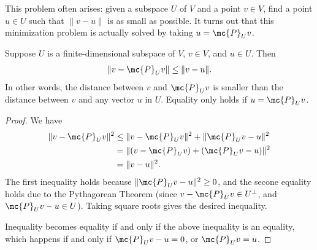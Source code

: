 \documentclass[math0540-lecture-notes.tex]{subfiles}
\begin{document}
This problem often arises: given a subspace $U$ of $V$ and a point $v\in V$, find a point $u\in U$
such that $\|v-u\|$ is as small as possible. It turns out that this minimization problem is actually
solved by taking $u=\mc{P}_Uv$.

\begin{proposition}{}
  Suppose $U$ is a finite-dimensional subspace of $V$, $v\in V$, and $u\in U$. Then \[
    \|v-\mc{P}_Uv\|\le \|v-u\|
  .\] In other words, the distance between $v$ and $\mc{P}_Uv$ is smaller than the distance between
  $v$ and any vector $u$ in $U$. Equality only holds if $u=\mc{P}_Uv$.
\end{proposition}
\begin{proof}[Proof]
  We have
  \begin{align*}
    \|v-\mc{P}_Uv\|^2&\le \|v-\mc{P}_Uv\|^2+\|\mc{P}_Uv-u\|^2\\
                     &=\|(v-\mc{P}_Uv)+(\mc{P}_Uv-u)\|^2\\
                     &=\|v-u\|^2
  .\end{align*}
  The first inequality holds because $\|\mc{P}_Uv-u\|^2\ge 0$, and the secone equality holds due to
  the Pythagorean Theorem (since $v-\mc{P}_Uv\in U^{\bot}$, and $\mc{P}_Uv-u\in U$). Taking square
  roots gives the desired inequality.

  Inequality becomes equality if and only if the above inequality is an equality, which happens if
  and only if $\mc{P}_Uv-u=0$, or $\mc{P}_Uv=u$.
\end{proof}






 
\end{document}
